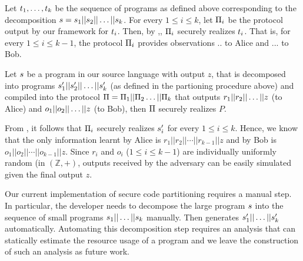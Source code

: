 Let $t_1, \ldots, t_k$ be the sequence of programs as defined above corresponding to the decomposition $s = s_1||s_2||\ldots||s_k$.  For every $1\leq i\leq k$, let $\Pi_i$ be the \mpc protocol output by our framework for $t_i$. Then, by ,, $\Pi_i$ securely realizes $t_i$. That is, for every $1\leq i \leq k-1$, the protocol $\Pi_i$ provides observations $..$ to Alice and $...$ to Bob. 


\begin{theorem}
Let $s$ be a program in our source language with output $z$, that
is decomposed into programs
$s'_1||s'_2||\dots||s'_k$ (as defined in
the partioning procedure above) and compiled into the protocol $\Pi
= \Pi_1||\Pi_2\dots||\Pi_k$ that outputs $r_1||
r_2||\dots|| z$
(to Alice) and $o_1|| o_2||\dots||z$ (to Bob), then $\Pi$ securely
realizes $P$.
\end{theorem}

 From , it follows that
$\Pi_i$ securely realizes $s'_i$ for every $1\leq i\leq
k$. Hence, we know that the only information learnt by Alice is
$r_1||r_2||\cdots||r_{k-1}||z$ and by Bob is
$o_1||o_2||\cdots||o_{k-1}||z$. Since $r_i$ and $o_i$ ($1\leq i\leq
k-1$) are individually uniformly random (in $(\mathbb{Z},+)$, outputs
received by the adversary can be easily simulated given the final
output $z$.

Our current implementation of secure code partitioning requires a manual step.
In particular, the developer needs to decompose the large program $s$ into 
the sequence of small programs $s_1||\dots||s_k$ manually.
Then \tool generates $s'_1||\dots||s'_k$ automatically.
Automating this decomposition step requires an analysis that can 
statically estimate the resource usage of a \tool program and we leave
the construction of such an analysis as future work.
